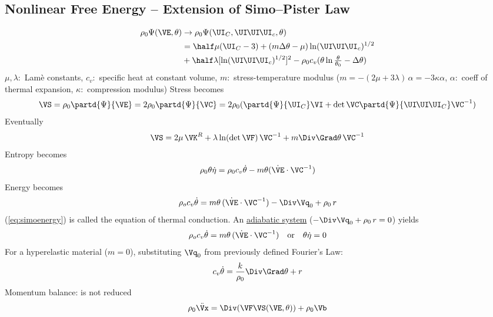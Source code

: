 \documentclass[a5paper,twosided,11pt,DIV=15,BCOR=0mm]{scrbook}
\newcommand{\rthree}{\UI\hspace{-0.07em}\UI\hspace{-0.07em}\UI}
\begin{document}
\subsection{Nonlinear Free Energy -- Extension of Simo--Pister Law}
\begin{align}
  \nonumber \rho_0\Psi(\VE,\theta)&\rightarrow\rho_0\Psi(\UI_C,\rthree_c,\theta)\\
  \nonumber &=\half\mu(\UI_C-3)+(m\Delta\theta-\mu)\ln(\rthree_c)^{1/2} \\
  & + \half\lambda[\ln(\rthree_c)^{1/2}]^2-
    \rho_0 c_v(\theta\ln\tfrac{\theta}{\theta_0}-\Delta\theta)
\end{align}
%
$\mu,\lambda$:~Lam\`e constants,
$c_v$:~specific heat at constant volume,
$m$:~stress-temperature modulus ($m=-(2\mu+3\lambda)\,\alpha = -3\kappa\alpha$, $\alpha$:~coeff of
thermal expansion, $\kappa$:~compression modulus)
Stress becomes
\begin{equation}
  \textstyle\VS=\rho_0\partd{\Psi}{\VE} = 2\rho_0\partd{\Psi}{\VC}
  = 2\rho_0 (\partd{\Psi}{\UI_C}\VI+\det\VC\partd{\Psi}{\rthree_C}\VC^{-1})
\end{equation}
Eventually
\begin{equation}
  \VS = 2\mu\,\VK^R+\lambda\ln(\det\VF)\,\VC^{-1}+m\Div\Grad\theta\,\VC^{-1}
\end{equation}
%
Entropy becomes
\begin{equation}
  \rho_0\theta\dot{\eta} = \rho_0c_v\dot{\theta}-m\theta(\dot{\VE}\cdot\VC^{-1})
\end{equation}
%
Energy becomes
\begin{equation}
  \rho_oc_v\dot{\theta} = m\theta\,(\dot{\VE}\cdot\VC^{-1})
  -\Div\Vq_0 + \rho_0\,r\label{eq:simoenergy}
\end{equation}
(\ref{eq:simoenergy}) is called the equation of thermal conduction.
%
An \underline{adiabatic system} ($-\Div\Vq_0 + \rho_0\,r=0$) yields
\begin{equation}
  \rho_oc_v\dot{\theta} = m\theta\,(\dot{\VE}\cdot\VC^{-1}) \quad\textup{or}\quad
  \theta\dot{\eta}=0
\end{equation}
For a hyperelastic material ($m=0$), substituting $\Vq_0$ from previously defined Fourier's Law:
\begin{equation}
  c_v\dot{\theta} = \frac{k}{\rho_0}\Div\Grad\theta+r
\end{equation}
Momentum balance: is not reduced
\begin{equation}
  \rho_0\ddot{\Vx}=\Div(\VF\VS(\VE,\theta)) + \rho_0\Vb\label{eq:simomomentum}
\end{equation}
\end{document}
